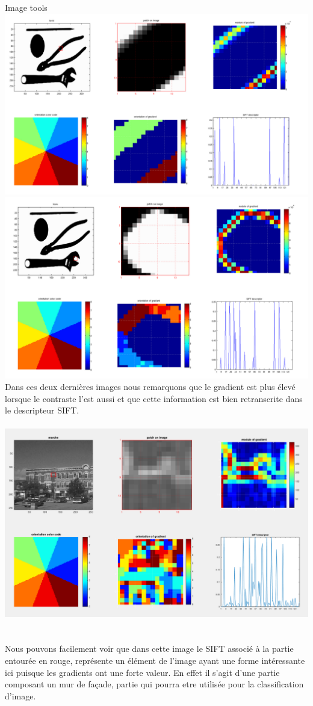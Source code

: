 \documentclass[a4paper]{article}
\begin{document}
Image tools\\
\includegraphics[width=\textwidth]{tools_80}
\\
\includegraphics[width=\textwidth]{tools_173}\\
Dans ces deux dernières images nous remarquons que le gradient est plus élevé lorsque le contraste l'est aussi et que cette information est bien retranscrite dans le descripteur SIFT.\\
\\\includegraphics[width=\textwidth]{sift}\\\\\\
Nous pouvons facilement voir que dans cette image le SIFT associé à la partie entourée en rouge, représente un élément de l'image ayant une forme intéressante ici puisque les gradients ont une forte valeur. En effet il s'agit d'une partie composant un mur de façade, partie qui pourra etre utilisée pour la classification d'image.
\end{document}
